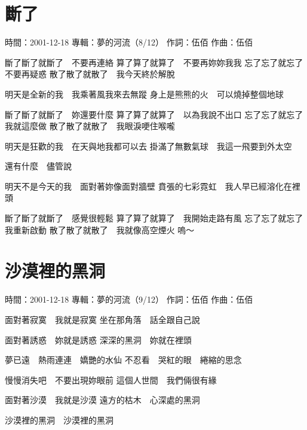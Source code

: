 \documentclass[UTF8,a4paper,oneside,twocolumn,12pt]{ctexbook}
\newcommand{\infopair}[2]{\textbullet #1：#2}
\newcommand{\zc}[1][伍佰]{\infopair{作詞}{#1}}
\newcommand{\zq}[1][伍佰]{\infopair{作曲}{#1}}
\newcommand{\zj}[1]{\infopair{專輯}{#1}}
\newcommand{\sj}[1]{\infopair{時間}{#1}}
\newenvironment{info}{\begin{flushleft}\kaishu
	}
	{\end{flushleft}\normalsize\yahei\par}
\newenvironment{lyric}{
	}
{}
\begin{document}
\section{斷了}
\begin{info}
	\sj{2001-12-18}
	\zj{夢的河流（8/12）}
	\zc
	\zq
\end{info}
\begin{lyric}
	斷了斷了就斷了　不要再連絡
	算了算了就算了　不要再妳妳我我
	忘了忘了就忘了　不要再疑惑
	散了散了就散了　我今天終於解脫

	明天是全新的我　我乘著風我來去無蹤
	身上是熊熊的火　可以燒掉整個地球

	斷了斷了就斷了　妳還要什麼
	算了算了就算了　以為我說不出口
	忘了忘了就忘了　我就這麼做
	散了散了就散了　我眼淚哽住喉嚨

	明天是狂歡的我　在天與地我都可以去
	掛滿了無數氣球　我這一飛要到外太空

	還有什麼　儘管說

	明天不是今天的我　面對著妳像面對牆壁
	賁張的七彩霓虹　我人早已經溶化在裡頭

	斷了斷了就斷了　感覺很輕鬆
	算了算了就算了　我開始走路有風
	忘了忘了就忘了　我重新啟動
	散了散了就散了　我就像高空煙火
	嗚～
\end{lyric}

\section{沙漠裡的黑洞}
\begin{info}
	\sj{2001-12-18}
	\zj{夢的河流（9/12）}
	\zc
	\zq
\end{info}
\begin{lyric}
	面對著寂寞　我就是寂寞
	坐在那角落　話全跟自己說

	面對著誘惑　妳就是誘惑
	深深的黑洞　妳就在裡頭

	夢已遠　熱雨連連　嬌艷的水仙
	不忍看　哭紅的眼　綣縮的思念

	慢慢消失吧　不要出現妳眼前
	這個人世間　我們倆很有緣

	面對著沙漠　我就是沙漠
	遠方的枯木　心深處的黑洞

	沙漠裡的黑洞　沙漠裡的黑洞
\end{lyric}
\end{document}

